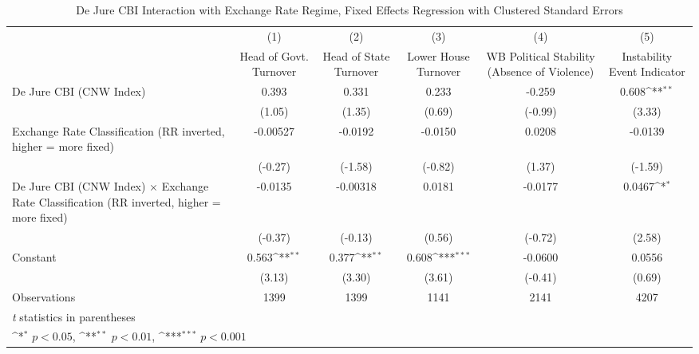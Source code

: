 \begin{table}[htbp]\centering
\def\sym#1{\ifmmode^{#1}\else\(^{#1}\)\fi}
\caption{De Jure CBI Interaction with Exchange Rate Regime, Fixed Effects Regression with Clustered Standard Errors \label{imultIndFEDJ}}
\begin{tabular*}{\linewidth}{@{\hskip\tabcolsep\extracolsep\fill}l*{5}{c}}
\toprule
                &\multicolumn{1}{c}{(1)}&\multicolumn{1}{c}{(2)}&\multicolumn{1}{c}{(3)}&\multicolumn{1}{c}{(4)}&\multicolumn{1}{c}{(5)}\\
                &\multicolumn{1}{c}{Head of Govt. Turnover}&\multicolumn{1}{c}{Head of State Turnover}&\multicolumn{1}{c}{Lower House Turnover}&\multicolumn{1}{c}{WB Political Stability (Absence of Violence)}&\multicolumn{1}{c}{Instability Event Indicator}\\
\midrule
De Jure CBI (CNW Index)&    0.393         &    0.331         &    0.233         &   -0.259         &    0.608\sym{**} \\
                &   (1.05)         &   (1.35)         &   (0.69)         &  (-0.99)         &   (3.33)         \\
\addlinespace
Exchange Rate Classification (RR inverted, higher = more fixed)& -0.00527         &  -0.0192         &  -0.0150         &   0.0208         &  -0.0139         \\
                &  (-0.27)         &  (-1.58)         &  (-0.82)         &   (1.37)         &  (-1.59)         \\
\addlinespace
De Jure CBI (CNW Index) $\times$ Exchange Rate Classification (RR inverted, higher = more fixed)&  -0.0135         & -0.00318         &   0.0181         &  -0.0177         &   0.0467\sym{*}  \\
                &  (-0.37)         &  (-0.13)         &   (0.56)         &  (-0.72)         &   (2.58)         \\
\addlinespace
Constant        &    0.563\sym{**} &    0.377\sym{**} &    0.608\sym{***}&  -0.0600         &   0.0556         \\
                &   (3.13)         &   (3.30)         &   (3.61)         &  (-0.41)         &   (0.69)         \\
\midrule
Observations    &     1399         &     1399         &     1141         &     2141         &     4207         \\
\bottomrule
\multicolumn{6}{l}{\footnotesize \textit{t} statistics in parentheses}\\
\multicolumn{6}{l}{\footnotesize \sym{*} \(p<0.05\), \sym{**} \(p<0.01\), \sym{***} \(p<0.001\)}\\
\end{tabular*}
\end{table}

